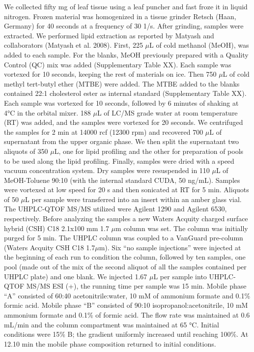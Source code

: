 \documentclass[9pt,twocolumn,twoside,lineno]{gsajnl}
\begin{document}
We collected fifty mg of leaf tissue using a leaf puncher and fast froze it in liquid nitrogen. Frozen material was homogenized in a tissue grinder Retsch (Haan, Germany) for 40 seconds at a frequency of 30 1/s. After grinding, samples were extracted. 
We performed lipid extraction as reported by Matyash and collaborators (Matyash et al. 2008). 
First, 225 $\mu$L of cold methanol (MeOH), was added to each sample. 
For the blanks, MeOH previously prepared with a Quality Control (QC) mix was added (Supplementary Table XX). Each sample was vortexed for 10 seconds, keeping the rest of materials on ice. 
Then 750 $\mu$L of cold methyl tert-butyl ether (MTBE) were added. The MTBE added to the blanks contained 22:1 cholesterol ester as internal standard (Supplementary Table XX). 
Each sample was vortexed for 10 seconds, followed by 6 minutes of shaking at 4°C in the orbital mixer. 
188 $\mu$L of LC/MS grade water at room temperature (RT) was added, and the samples were vortexed for 20 seconds.
We centrifuged the samples for 2 min at 14000 rcf (12300 rpm) and recovered 700 $\mu$L of supernatant from the upper organic phase. 
We then split the supernatant two aliquots of 350 $\mu$L, one for lipid profiling and the other for preparation of pools to be used along the lipid profiling. 
Finally, samples were dried with a speed vacuum concentration system.
Dry samples were resuspended in 110 $\mu$L of MeOH-Toluene 90:10 (with the internal standard CUDA, 50 ng/mL). 
Samples were vortexed at low speed for 20 s and then sonicated at RT for 5 min. 
Aliquots of 50 $\mu$L per sample were transferred into an insert within an amber glass vial.
The UHPLC-QTOF MS/MS utilized were Agilent 1290 and Agilent 6530, respectively. 
Before analyzing the samples a new Waters Acquity charged surface hybrid (CSH) C18 2.1x100 mm 1.7 $\mu$m column was set. 
The column was initially purged for 5 min. 
The UHPLC column was coupled to a VanGuard pre-column (Waters Acquity CSH C18 1.7$\mu$m). 
Six “no sample injections” were injected at the beginning of each run to condition the column, followed by ten samples, one pool (made out of the mix of the second aliquot of all the samples contained per UHPLC plate) and one blank.
We injected 1.67 $\mu$L per sample into UHPLC-QTOF MS/MS ESI (+), the running time per sample was 15 min. Mobile phase “A” consisted of 60:40 acetonitrile:water, 10 mM of ammonium formate and 0.1\% formic acid. 
Mobile phase “B” consisted of 90:10 isopropanol:acetonitrile, 10 mM ammonium formate and 0.1\% of formic acid. 
The flow rate was maintained at 0.6 mL/min and the column compartment was maintained at 65 °C. Initial conditions were 15\% B; the gradient uniformly increased until reaching 100\%. 
At 12.10 min the mobile phase composition returned to initial conditions.
\end{document}
